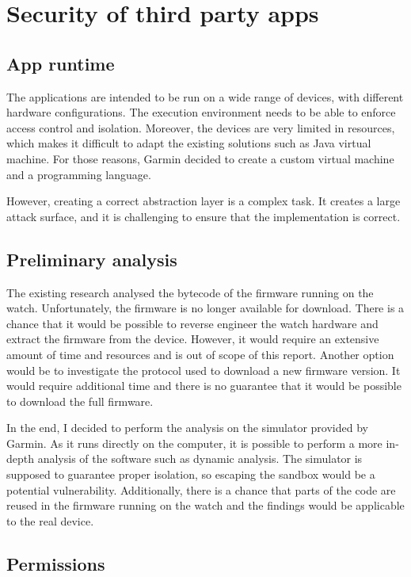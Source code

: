 
\section{Security of third party apps}

\subsection{App runtime}

The applications are intended to be run on a wide range of devices, with different hardware configurations.
The execution environment needs to be able to enforce access control and isolation.
Moreover, the devices are very limited in resources, which makes it difficult to adapt the existing solutions such as Java virtual machine.
For those reasons, Garmin decided to create a custom virtual machine and a programming language.

However, creating a correct abstraction layer is a complex task.
It creates a large attack surface, and it is challenging to ensure that the implementation is correct.

\subsection{Preliminary analysis}
The existing research analysed the bytecode of the firmware running on the watch.
Unfortunately, the firmware is no longer available for download.
There is a chance that it would be possible to reverse engineer the watch hardware and extract the firmware from the device.
However, it would require an extensive amount of time and resources and is out of scope of this report.
Another option would be to investigate the protocol used to download a new firmware version.
It would require additional time and there is no guarantee that it would be possible to download the full firmware.

In the end, I decided to perform the analysis on the simulator provided by Garmin.
As it runs directly on the computer, it is possible to perform a more in-depth analysis of the software such as dynamic analysis.
The simulator is supposed to guarantee proper isolation, so escaping the sandbox would be a potential vulnerability.
Additionally, there is a chance that parts of the code are reused in the firmware running on the watch and the findings would be applicable to the real device.

\subsection{Permissions}

